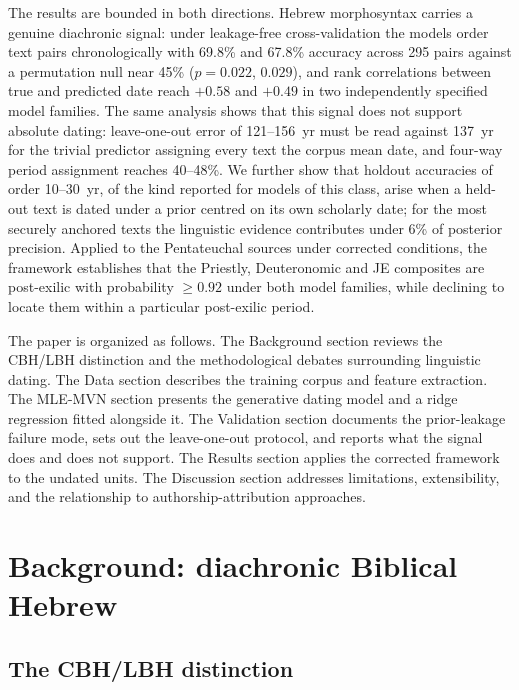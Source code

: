 \documentclass[10pt,letterpaper]{article}
\begin{document}
The results are bounded in both directions.  Hebrew morphosyntax
carries a genuine diachronic signal: under leakage-free cross-validation
the models order text pairs chronologically with 69.8\% and 67.8\%
accuracy across 295 pairs against a permutation null near 45\%
($p = 0.022$, $0.029$), and rank correlations between true and predicted
date reach $+0.58$ and $+0.49$ in two independently specified model
families.  The same analysis shows that this signal does
not support absolute dating: leave-one-out error of 121--156~yr must be
read against 137~yr for the trivial predictor assigning every text the
corpus mean date, and four-way period assignment reaches 40--48\%.  We
further show that holdout accuracies of order 10--30~yr, of the kind
reported for models of this class, arise when a held-out text is dated
under a prior centred on its own scholarly date; for the most securely
anchored texts the linguistic evidence contributes under 6\% of posterior
precision.  Applied to the Pentateuchal sources
under corrected conditions, the framework establishes that the Priestly,
Deuteronomic and JE composites are post-exilic with probability
$\geq 0.92$ under both model families, while declining to locate them
within a particular post-exilic period.

The paper is organized as follows.  The Background section reviews the
CBH/LBH distinction and the methodological debates surrounding linguistic
dating.  The Data section describes the training corpus and feature
extraction.  The MLE-MVN section presents the generative dating model and
a ridge regression fitted alongside it.  The Validation section documents the prior-leakage
failure mode, sets out the leave-one-out protocol, and reports what the
signal does and does not support.  The Results section applies the
corrected framework to the undated units.  The Discussion section
addresses limitations, extensibility, and the relationship to
authorship-attribution approaches.

\section*{Background: diachronic Biblical Hebrew}

\subsection*{The CBH/LBH distinction}
\end{document}
